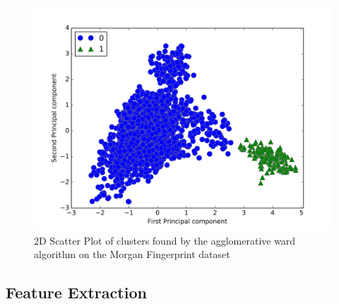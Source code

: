 \documentclass[a4paper,12pt]{report}
\begin{document}
			\begin{figure}[H]
				\centering
				\includegraphics[width=\textwidth,scale=1,totalheight=0.4\textheight]{images/agg_morgan_scatter}
				\caption{2D Scatter Plot of clusters found by the agglomerative ward algorithm on the Morgan Fingerprint dataset}
				\label{fig:agg_morgan_scatter}
			\end{figure}
		\subsection{Feature Extraction}
\end{document}
